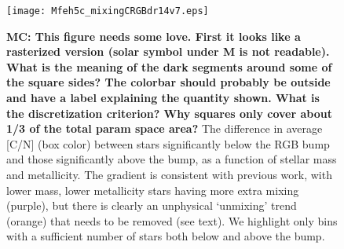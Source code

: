 \begin{figure}[!tb]
\begin{center}
\texttt{[image: Mfeh5c\_mixingCRGBdr14v7.eps]}%
\caption{\textbf{MC: This figure needs some love. First it looks like a rasterized version (solar symbol under M is not readable). What is the meaning of the dark segments around some of the square sides? The colorbar should probably be outside and have a label explaining the quantity shown. What is the discretization criterion? Why squares only cover about 1/3 of the total param space area?} The difference in average [C/N] (box color) between stars significantly below the RGB bump and those significantly above the bump, as a function of stellar mass and metallicity. The gradient is consistent with previous work, with lower mass, lower metallicity stars having more extra mixing (purple), but there is clearly an unphysical `unmixing' trend (orange) that needs to be removed (see text). We highlight only bins with a sufficient number of stars both below and above the bump. }%
\label{fig:obssquare}
\end{center}
\end{figure}


